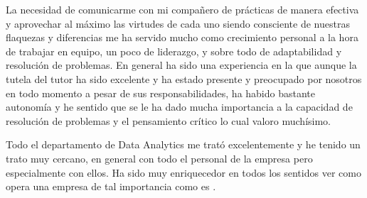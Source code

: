 La necesidad de comunicarme con mi compañero de prácticas de manera efectiva y aprovechar al máximo las virtudes de cada uno siendo consciente de nuestras flaquezas y diferencias me ha servido mucho como crecimiento personal a la hora de trabajar en equipo, un poco de liderazgo, y sobre todo de adaptabilidad y resolución de problemas.
\newpage
En general ha sido una experiencia en la que aunque la tutela del tutor ha sido excelente y ha estado presente y preocupado por nosotros en todo momento a pesar de sus responsabilidades, ha habido bastante autonomía y he sentido que se le ha dado mucha importancia a la capacidad de resolución de problemas y el pensamiento crítico lo cual valoro muchísimo.

Todo el departamento de Data Analytics me trató excelentemente y he tenido un trato muy cercano, en general con todo el personal de la empresa pero especialmente con ellos. Ha sido muy enriquecedor en todos los sentidos ver como opera una empresa de tal importancia como es \href{https://www.mecalux.es/}{}. 